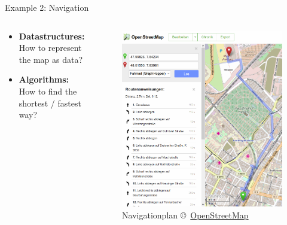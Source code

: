 \begin{frame}{Example 2: Navigation}
  \begin{columns}
    \begin{column}{0.55\textwidth}
      \begin{itemize}
        \item<2-|handout:1>
          \textbf{Datastructures:} How to represent the map as data?
        \item<3-|handout:1>
          \textbf{Algorithms:} How to find the shortest / fastest way?
      \end{itemize}
    \end{column}%
    \begin{column}{0.45\textwidth}
      \begin{figure}
        \includegraphics[width=\textwidth]
          {Images/Introduction/OpenStreetmap.png}
        \caption{Navigationplan \copyright\,%
          \href{http://openstreetmap.org/}{OpenStreetMap}%
        }%
        \label{fig:openstreetmap}
      \end{figure}
    \end{column}
  \end{columns}
\end{frame}